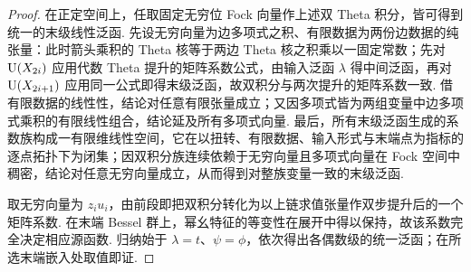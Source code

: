 \begin{proof}
在正定空间上，任取固定无穷位 Fock 向量作上述双 Theta 积分，皆可得到统一的末级线性泛函. 先设无穷向量为边多项式之积、有限数据为两份边数据的纯张量：此时箭头乘积的 Theta 核等于两边 Theta 核之积乘以一固定常数；先对 $\operatorname{U}(X_{2i})$ 应用代数 Theta 提升的矩阵系数公式，由输入泛函 $\lambda$ 得中间泛函，再对 $\operatorname{U}(X_{2i+1})$ 应用同一公式即得末级泛函，故双积分与两次提升的矩阵系数一致. 借有限数据的线性性，结论对任意有限张量成立；又因多项式皆为两组变量中边多项式乘积的有限线性组合，结论延及所有多项式向量. 最后，所有末级泛函生成的系数族构成一有限维线性空间，它在以扭转、有限数据、输入形式与末端点为指标的逐点拓扑下为闭集；因双积分族连续依赖于无穷向量且多项式向量在 Fock 空间中稠密，结论对任意无穷向量成立，从而得到对整族变量一致的末级泛函.

取无穷向量为 $z_i u_i$，由前段即把双积分转化为以上链求值张量作双步提升后的一个矩阵系数. 在末端 Bessel 群上，幂幺特征的等变性在展开中得以保持，故该系数完全决定相应源函数. 归纳始于 $\lambda=t$、$\psi=\phi$，依次得出各偶数级的统一泛函；在所选末端嵌入处取值即证.
\end{proof}

